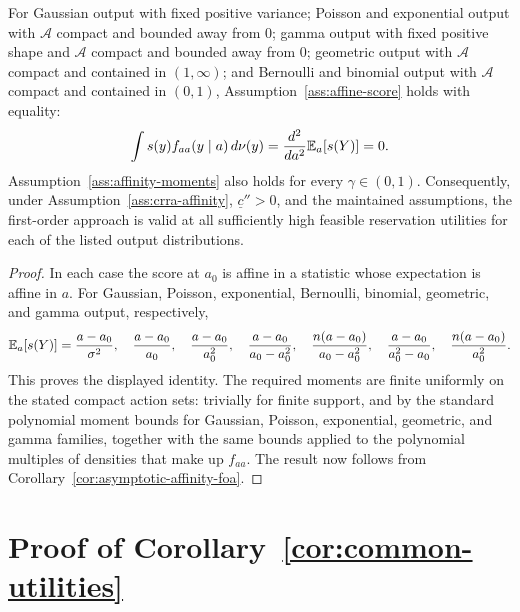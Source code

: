 \documentclass[12pt]{article}
\begin{document}
\begin{corollary}
\label{cor:gaussian-crra-extension}
For Gaussian output with fixed positive variance; Poisson and exponential
output with $\mathcal A$ compact and bounded away from $0$; gamma output with
fixed positive shape and $\mathcal A$ compact and bounded away from $0$;
geometric output with $\mathcal A$ compact and contained in $(1,\infty)$; and
Bernoulli and binomial output with $\mathcal A$ compact and contained in
$(0,1)$, Assumption~\ref{ass:affine-score} holds with equality:
\[
    \int s(y)f_{aa}(y\mid a)\,d\nu(y)
    =\frac{d^2}{da^2}\mathbb{E}_a[s(Y)]=0.
\]
Assumption~\ref{ass:affinity-moments} also holds for every
$\gamma\in(0,1)$.  Consequently, under Assumption~\ref{ass:crra-affinity},
$\underline c''>0$, and the maintained assumptions, the first-order approach
is valid at all sufficiently high feasible reservation utilities for each of
the listed output distributions.
\end{corollary}

\begin{proof}
In each case the score at $a_0$ is affine in a statistic whose expectation is
affine in $a$.  For Gaussian, Poisson, exponential, Bernoulli, binomial,
geometric, and gamma output, respectively,
\[
    \mathbb{E}_a[s(Y)]
    =
    \frac{a-a_0}{\sigma^2},\quad
    \frac{a-a_0}{a_0},\quad
    \frac{a-a_0}{a_0^2},\quad
    \frac{a-a_0}{a_0-a_0^2},\quad
    \frac{n(a-a_0)}{a_0-a_0^2},\quad
    \frac{a-a_0}{a_0^2-a_0},\quad
    \frac{n(a-a_0)}{a_0^2}.
\]
This proves the displayed identity.  The required moments are finite uniformly
on the stated compact action sets: trivially for finite support, and by the
standard polynomial moment bounds for Gaussian, Poisson, exponential,
geometric, and gamma families, together with the same bounds applied to the
polynomial multiples of densities that make up $f_{aa}$.  The result now
follows from Corollary~\ref{cor:asymptotic-affinity-foa}.
\end{proof}

\section{Proof of Corollary~\ref{cor:common-utilities}}
\label{sec:proof-common-utilities}
\end{document}
